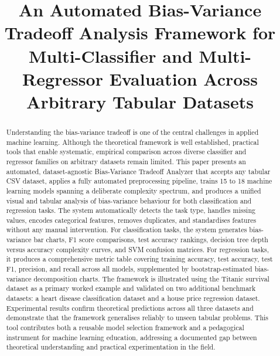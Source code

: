 \documentclass[conference]{IEEEtran}
\begin{document}
\title{An Automated Bias-Variance Tradeoff Analysis Framework for
Multi-Classifier and Multi-Regressor Evaluation Across Arbitrary Tabular Datasets}

\author{
}

\maketitle
\IEEEpubidadjcol
\pagestyle{plain}

\begin{abstract}
Understanding the bias-variance tradeoff is one of the central challenges in applied machine learning. Although the theoretical framework is well established, practical tools that enable systematic, empirical comparison across diverse classifier and regressor families on arbitrary datasets remain limited. This paper presents an automated, dataset-agnostic Bias-Variance Tradeoff Analyzer that accepts any tabular CSV dataset, applies a fully automated preprocessing pipeline, trains 15 to 18 machine learning models spanning a deliberate complexity spectrum, and produces a unified visual and tabular analysis of bias-variance behaviour for both classification and regression tasks. The system automatically detects the task type, handles missing values, encodes categorical features, removes duplicates, and standardises features without any manual intervention. For classification tasks, the system generates bias-variance bar charts, F1 score comparisons, test accuracy rankings, decision tree depth versus accuracy complexity curves, and SVM confusion matrices. For regression tasks, it produces a comprehensive metric table covering training accuracy, test accuracy, test F1, precision, and recall across all models, supplemented by bootstrap-estimated bias-variance decomposition charts. The framework is illustrated using the Titanic survival dataset as a primary worked example and validated on two additional benchmark datasets: a heart disease classification dataset and a house price regression dataset. Experimental results confirm theoretical predictions across all three datasets and demonstrate that the framework generalises reliably to unseen tabular problems. This tool contributes both a reusable model selection framework and a pedagogical instrument for machine learning education, addressing a documented gap between theoretical understanding and practical experimentation in the field.
\end{abstract}
\end{document}
